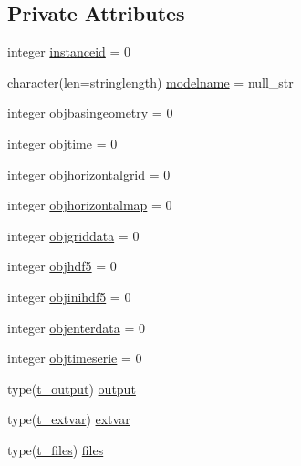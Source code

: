\subsection*{Private Attributes}
\begin{DoxyCompactItemize}
\item 
integer \mbox{\hyperlink{structmodulesnow_1_1t__snow_a264183d6ebea2e2629911bea3b70c287}{instanceid}} = 0
\item 
character(len=stringlength) \mbox{\hyperlink{structmodulesnow_1_1t__snow_a9f6fc501fc3b8cd3b8424f1666a86da2}{modelname}} = null\+\_\+str
\item 
integer \mbox{\hyperlink{structmodulesnow_1_1t__snow_acd2485e66d8546de7dde1c9e0e90c928}{objbasingeometry}} = 0
\item 
integer \mbox{\hyperlink{structmodulesnow_1_1t__snow_ab7a98214680585e54e7e3f08eb154a4f}{objtime}} = 0
\item 
integer \mbox{\hyperlink{structmodulesnow_1_1t__snow_a1f4f6e44f629ea56308183a84c09bc27}{objhorizontalgrid}} = 0
\item 
integer \mbox{\hyperlink{structmodulesnow_1_1t__snow_a277cae57af7f38e3c39dd1df8fcda2e6}{objhorizontalmap}} = 0
\item 
integer \mbox{\hyperlink{structmodulesnow_1_1t__snow_ac567a0410f238673df658e731c23053c}{objgriddata}} = 0
\item 
integer \mbox{\hyperlink{structmodulesnow_1_1t__snow_aa6f53b3959bb2622b4a02a7b6880f709}{objhdf5}} = 0
\item 
integer \mbox{\hyperlink{structmodulesnow_1_1t__snow_acd4394e6942359e45e6ee10708596e40}{objinihdf5}} = 0
\item 
integer \mbox{\hyperlink{structmodulesnow_1_1t__snow_a921ffdda134279e6108f27379066ef30}{objenterdata}} = 0
\item 
integer \mbox{\hyperlink{structmodulesnow_1_1t__snow_a8ee9dbecc401e6a027cd56194b1aadd5}{objtimeserie}} = 0
\item 
type(\mbox{\hyperlink{structmodulesnow_1_1t__output}{t\+\_\+output}}) \mbox{\hyperlink{structmodulesnow_1_1t__snow_a762a12dac2bd92d51a7e6bd05f344ed8}{output}}
\item 
type(\mbox{\hyperlink{structmodulesnow_1_1t__extvar}{t\+\_\+extvar}}) \mbox{\hyperlink{structmodulesnow_1_1t__snow_ad24caf14edb34995059cf81af2046034}{extvar}}
\item 
type(\mbox{\hyperlink{structmodulesnow_1_1t__files}{t\+\_\+files}}) \mbox{\hyperlink{structmodulesnow_1_1t__snow_a966b4f4781cc22f99e25bad6330b627a}{files}}
\item 

\end{DoxyCompactItemize}
